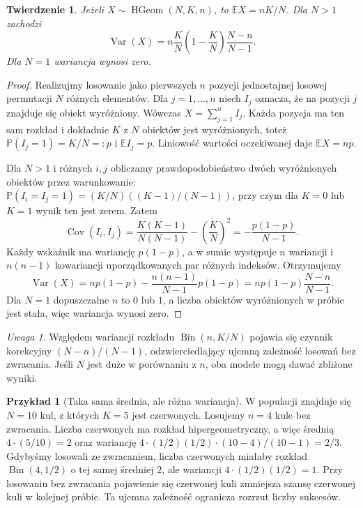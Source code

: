 \documentclass[11pt,a4paper,oneside]{report}
\numberwithin{equation}{chapter}
\theoremstyle{plain}
\newtheorem{twierdzenie}{Twierdzenie}[chapter]
\theoremstyle{definition}
\newtheorem{przyklad}{Przykład}[chapter]
\theoremstyle{remark}
\newtheorem{uwaga}{Uwaga}[chapter]
\newcommand{\Prob}{\mathbb{P}}
\newcommand{\E}{\mathbb{E}}
\newcommand{\Var}{\operatorname{Var}}
\newcommand{\Cov}{\operatorname{Cov}}
\newcommand{\Bin}{\operatorname{Bin}}
\begin{document}
\begin{twierdzenie}
Jeżeli $X\sim\operatorname{HGeom}(N,K,n)$, to
$\E X=nK/N$. Dla $N>1$ zachodzi
\[
\Var(X)=n\frac KN\left(1-\frac KN\right)\frac{N-n}{N-1}.
\]
Dla $N=1$ wariancja wynosi zero.
\end{twierdzenie}
\begin{proof}
Realizujmy losowanie jako pierwszych $n$ pozycji jednostajnej
losowej permutacji $N$ różnych elementów. Dla
$j=1,\ldots,n$ niech $I_j$ oznacza, że na pozycji $j$
znajduje się obiekt wyróżniony. Wówczas
$X=\sum_{j=1}^n I_j$.
Każda pozycja ma ten sam rozkład i dokładnie $K$
z $N$ obiektów jest wyróżnionych, toteż
$\Prob(I_j=1)=K/N=:p$ i $\E I_j=p$.
Liniowość wartości oczekiwanej daje $\E X=np$.

Dla $N>1$ i różnych $i,j$ obliczamy prawdopodobieństwo
dwóch wyróżnionych obiektów przez warunkowanie:
$\Prob(I_i=I_j=1)=(K/N)((K-1)/(N-1))$,
przy czym dla $K=0$ lub $K=1$ wynik ten jest zerem.
Zatem
\[
\Cov(I_i,I_j)=\frac{K(K-1)}{N(N-1)}-
\left(\frac KN\right)^2
=-\frac{p(1-p)}{N-1}.
\]
Każdy wskaźnik ma wariancję $p(1-p)$, a w sumie
występuje $n$ wariancji i $n(n-1)$ kowariancji
uporządkowanych par różnych indeksów. Otrzymujemy
\[
\Var(X)=np(1-p)-\frac{n(n-1)}{N-1}p(1-p)
=np(1-p)\frac{N-n}{N-1}.
\]
Dla $N=1$ dopuszczalne $n$ to $0$ lub $1$,
a liczba obiektów wyróżnionych w próbie jest stała,
więc wariancja wynosi zero.
\end{proof}

\begin{uwaga}
Względem wariancji rozkładu $\Bin(n,K/N)$ pojawia się
czynnik korekcyjny $(N-n)/(N-1)$, odzwierciedlający ujemną
zależność losowań bez zwracania. Jeśli $N$ jest duże w porównaniu
z $n$, oba modele mogą dawać zbliżone wyniki.
\end{uwaga}


\begin{przyklad}[Taka sama średnia, ale różna wariancja]
W populacji znajduje się $N=10$ kul, z których $K=5$
jest czerwonych. Losujemy $n=4$ kule bez zwracania.
Liczba czerwonych ma rozkład hipergeometryczny,
a więc średnią $4\cdot(5/10)=2$ oraz wariancję
$4\cdot(1/2)(1/2)\cdot(10-4)/(10-1)=2/3$.
Gdybyśmy losowali ze zwracaniem, liczba czerwonych
miałaby rozkład $\Bin(4,1/2)$ o tej samej średniej $2$,
ale wariancji $4\cdot(1/2)(1/2)=1$.
Przy losowaniu bez zwracania pojawienie się czerwonej kuli
zmniejsza szansę czerwonej kuli w kolejnej próbie.
Ta ujemna zależność ogranicza rozrzut liczby sukcesów.
\end{przyklad}
\end{document}
